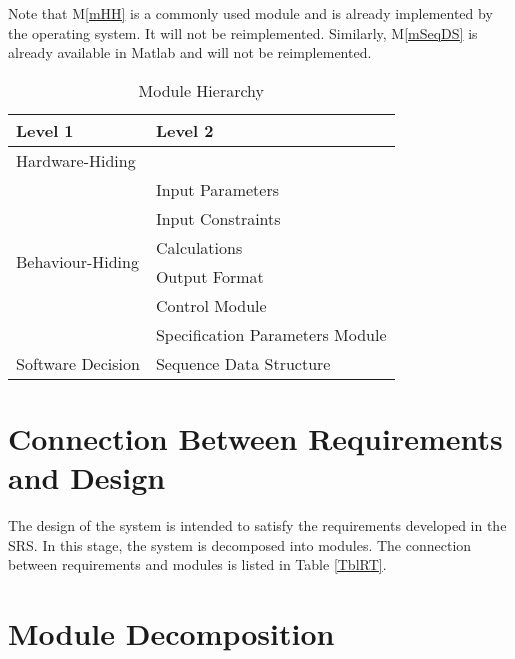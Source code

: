 \documentclass[12pt]{article}
\newcommand{\mref}[1]{M\ref{#1}}
\begin{document}
Note that \mref{mHH} is a commonly used module and is already implemented by the 
operating system.  It will not be reimplemented.  Similarly, \mref{mSeqDS}
is already available in Matlab and will not be reimplemented.

\begin{table}[h!]
\centering
\begin{tabular}{p{} p{}}
\toprule
\textbf{Level 1} & \textbf{Level 2}\\
\midrule

{Hardware-Hiding} & ~ \\
\midrule

\multirow{6}{0.3\textwidth}{Behaviour-Hiding} & Input Parameters\\
& Input Constraints\\
& Calculations \\
& Output Format\\
& Control Module\\
& Specification Parameters Module\\
\midrule

\multirow{1}{0.3\textwidth}{Software Decision} & Sequence Data Structure\\
\bottomrule

\end{tabular}
\caption{Module Hierarchy}
\label{TblMH}
\end{table}

\section{Connection Between Requirements and Design} \label{SecConnection}

The design of the system is intended to satisfy the requirements developed in
the SRS. In this stage, the system is decomposed into modules. The connection
between requirements and modules is listed in Table \ref{TblRT}.

\section{Module Decomposition} \label{SecMD}
\end{document}
